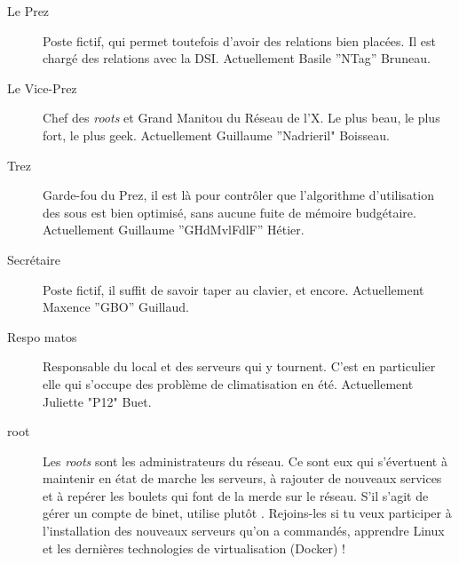 \begin{description}

  \item[Le Prez]{Poste fictif, qui permet toutefois d'avoir des relations bien placées. Il est chargé des relations avec la DSI. Actuellement Basile ''NTag'' Bruneau.}
  
  \item[Le Vice-Prez]{Chef des \emph{roots} et Grand Manitou du Réseau de l'X. Le plus beau, le plus fort, le plus geek. Actuellement Guillaume ''Nadrieril" Boisseau.}

  \item[Trez]{Garde-fou du Prez, il est là pour contrôler que l'algorithme d'utilisation des sous est bien optimisé, sans aucune fuite de mémoire budgétaire. Actuellement Guillaume ''GHdMvlFdlF'' Hétier.}

  \item[Secrétaire]{Poste fictif, il suffit de savoir taper au clavier, et encore. Actuellement Maxence ''GBO'' Guillaud.}

 \item[Respo matos]{Responsable du local et des serveurs qui y tournent. C'est en particulier elle qui s'occupe des problème de climatisation en été. Actuellement Juliette "P12" Buet.}

  \item[root]{Les \emph{roots} sont les administrateurs du réseau. Ce sont eux qui s'évertuent à maintenir en état de marche les serveurs, à rajouter de 
  nouveaux services et à repérer les boulets qui font de la merde sur le réseau. S'il s'agit de gérer un compte de binet, utilise plutôt . Rejoins-les si tu veux participer à l'installation des nouveaux serveurs qu'on a commandés, apprendre Linux et les dernières technologies de virtualisation (Docker) !}

%  
%
  

\end{description}
